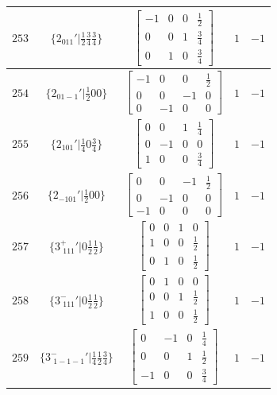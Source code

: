 \documentclass[fleqn,8pt]{jsarticle}
\begin{document}
\begin{longtable}{ccccc}
$ 253 $ & $ \{2{}_{011}{}'|\frac{1}{2} \frac{3}{4} \frac{3}{4}\} $ & $ \begin{bmatrix} -1 & 0 & 0 & \frac{1}{2} \\ 0 & 0 & 1 & \frac{3}{4} \\ 0 & 1 & 0 & \frac{3}{4} \end{bmatrix} $ & $ 1 $ & $ -1 $ \\ \hline
$ 254 $ & $ \{2{}_{01-1}{}'|\frac{1}{2} 0 0\} $ & $ \begin{bmatrix} -1 & 0 & 0 & \frac{1}{2} \\ 0 & 0 & -1 & 0 \\ 0 & -1 & 0 & 0 \end{bmatrix} $ & $ 1 $ & $ -1 $ \\ \hline
$ 255 $ & $ \{2{}_{101}{}'|\frac{1}{4} 0 \frac{3}{4}\} $ & $ \begin{bmatrix} 0 & 0 & 1 & \frac{1}{4} \\ 0 & -1 & 0 & 0 \\ 1 & 0 & 0 & \frac{3}{4} \end{bmatrix} $ & $ 1 $ & $ -1 $ \\ \hline
$ 256 $ & $ \{2{}_{-101}{}'|\frac{1}{2} 0 0\} $ & $ \begin{bmatrix} 0 & 0 & -1 & \frac{1}{2} \\ 0 & -1 & 0 & 0 \\ -1 & 0 & 0 & 0 \end{bmatrix} $ & $ 1 $ & $ -1 $ \\ \hline
$ 257 $ & $ \{3^{+}_{\,\,111}{}'|0 \frac{1}{2} \frac{1}{2}\} $ & $ \begin{bmatrix} 0 & 0 & 1 & 0 \\ 1 & 0 & 0 & \frac{1}{2} \\ 0 & 1 & 0 & \frac{1}{2} \end{bmatrix} $ & $ 1 $ & $ -1 $ \\ \hline
$ 258 $ & $ \{3^{-}_{\,\,111}{}'|0 \frac{1}{2} \frac{1}{2}\} $ & $ \begin{bmatrix} 0 & 1 & 0 & 0 \\ 0 & 0 & 1 & \frac{1}{2} \\ 1 & 0 & 0 & \frac{1}{2} \end{bmatrix} $ & $ 1 $ & $ -1 $ \\ \hline
$ 259 $ & $ \{3^{-}_{\,\,1-1-1}{}'|\frac{1}{4} \frac{1}{2} \frac{3}{4}\} $ & $ \begin{bmatrix} 0 & -1 & 0 & \frac{1}{4} \\ 0 & 0 & 1 & \frac{1}{2} \\ -1 & 0 & 0 & \frac{3}{4} \end{bmatrix} $ & $ 1 $ & $ -1 $ \\ \hline

\end{longtable}
\end{document}
